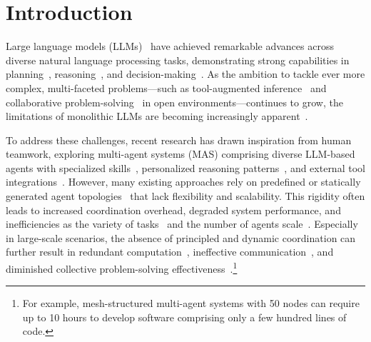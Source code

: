 \documentclass{article}
\begin{document}
\section{Introduction}
Large language models (LLMs)~\cite{wei2022emergent,radford2019language,kaplan2020scaling} have achieved remarkable advances across diverse natural language processing tasks, demonstrating strong capabilities in planning~\cite{valmeekam2023on,song2023llmplanner,qiao2024agent}, reasoning~\cite{wei2022chain,shao2024deepseekmathpushinglimitsmathematical,lightman2023let}, and decision-making~\cite{10.5555/3600270.3602532,wang2023voyager,saycan2022arxiv}. As the ambition to tackle ever more complex, multi-faceted problems—such as tool-augmented inference~\cite{qin2023toolllm,schick2023toolformer,zhuang2023toolqa,9156851} and collaborative problem-solving~\cite{park2023generative,li2024camel,chen2025internet} in open environments—continues to grow, the limitations of monolithic LLMs are becoming increasingly apparent~\cite{weng2023agent,chen2024are,chen2025optimizingmodelselectioncompound}.

To address these challenges, recent research has drawn inspiration from human teamwork, exploring multi-agent systems (MAS) comprising diverse LLM-based agents with specialized skills~\cite{qian2025scaling, Shanahan2023}, personalized reasoning patterns~\cite{wei2022chain,yao2023treethoughtsdeliberateproblem,qi2024mutualreasoningmakessmaller}, and external tool integrations~\cite{zhuang2024toolchain, qin2023toolllm}. However, many existing approaches rely on predefined or statically generated agent topologies~\cite{tang2023medagents,qian2024chatdevcommunicativeagentssoftware} that lack flexibility and scalability. This rigidity often leads to increased coordination overhead, degraded system performance, and inefficiencies as the variety of tasks~\cite{zhang2025aflowautomatingagenticworkflow,hu2025automateddesignagenticsystems} and the number of agents scale~\cite{qian2025scaling}. Especially in large-scale scenarios, the absence of principled and dynamic coordination can further result in redundant computation~\cite{ye2025masgpttrainingllmsbuild}, ineffective communication~\cite{chen2025optimaoptimizingeffectivenessefficiency}, and diminished collective problem-solving effectiveness~\cite{cemri2025multiagentllmsystemsfail}.\footnote{For example, mesh-structured multi-agent systems with 50 nodes can require up to 10 hours to develop software comprising only a few hundred lines of code.}
\end{document}
